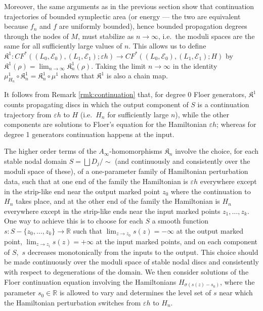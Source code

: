\documentclass[11pt,leqno]{amsart}
\numberwithin{equation}{section}
\def\R{\mathbb{R}}
\newcommand{\cE}{{\mathcal E}}
\begin{document}
Moreover, the same arguments as in the previous section show that
continuation trajectories of bounded symplectic area (or energy --- the two
are equivalent because $f_n$ and $f$ are uniformly bounded), hence bounded
propagation degrees through the nodes of $M$, must stabilize as $n\to
\infty$, i.e.\ the moduli spaces are the same for all sufficiently large
values of $n$.  This allows us to define
$\mathfrak{K}^1:CF^*((L_0,\cE_0),(L_1,\cE_1);\varepsilon h)\to
CF^*((L_0,\cE_0),(L_1,\cE_1);H)$ by $\mathfrak{K}^1(\rho)=\lim_{n\to \infty}
\mathfrak{K}^1_n(\rho)$.  Taking the limit $n\to \infty$ in the identity
$\mu^1_{H_n}\circ \mathfrak{K}^1_n=\mathfrak{K}^1_n\circ \mu^1$ shows that $\mathfrak{K}^1$ is also
a chain map.

It follows from Remark \ref{rmk:continuation} that, for degree 0 Floer
generators, $\mathfrak{K}^1$ counts propagating discs in which the output component
of $S$ is a continuation trajectory from $\varepsilon h$ to $H$ (i.e.\ $H_n$
for sufficiently large $n$), while the other components are solutions to
Floer's equation for the Hamiltonian $\varepsilon h$; whereas for
degree 1 generators continuation happens at the input.%
\medskip

The higher order terms of the $A_\infty$-homomorphisms $\mathfrak{K}_n$ involve the
choice, for each stable nodal domain $S=\bigsqcup D_j/\sim$ (and continuously
and consistently over the moduli space of these), of a one-parameter
family of Hamiltonian perturbation data, such that at one end of the family
the Hamiltonian is $\varepsilon h$ everywhere except in the strip-like
end near the output marked point $z_0$ where the continuation to $H_n$ takes
place, and at the other end of the family the Hamiltonian is $H_n$ everywhere except in the
strip-like ends near the input marked points $z_1,\dots,z_k$.
One way to achieve this is to choose for each $S$ a 
smooth function $s:S-\{z_0,\dots,z_k\}\to \R$ such that 
$\lim_{z\to z_0} s(z)=-\infty$ at the output marked point, $\lim_{z\to z_i}
s(z)=+\infty$ at the input marked points, and on each component of $S,$
$s$ decreases monotonically from the inputs to the output. This
choice should be made continuously
over the moduli space of stable nodal discs and consistently with respect to
degenerations of the domain. We then consider solutions of the Floer
continuation equation involving the Hamiltonians $H_{\sigma\left(s(z)-s_0\right)}$, where
the parameter $s_0\in \R$ is allowed to vary and determines the level set of
$s$ near which the Hamiltonian perturbation switches from $\varepsilon h$ to
$H_n$.
\end{document}
